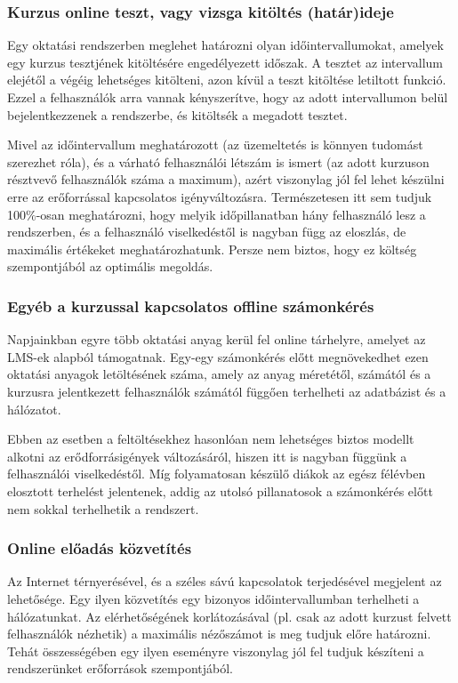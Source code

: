 \subsubsection{Kurzus online teszt, vagy vizsga kitöltés (határ)ideje}

Egy oktatási rendszerben meglehet határozni olyan időintervallumokat, amelyek egy kurzus tesztjének kitöltésére engedélyezett időszak. A tesztet az intervallum elejétől a végéig lehetséges kitölteni, azon kívül a teszt kitöltése letiltott funkció. Ezzel a felhasználók arra vannak kényszerítve, hogy az adott intervallumon belül bejelentkezzenek a rendszerbe, és kitöltsék a megadott tesztet.

Mivel az időintervallum meghatározott (az üzemeltetés is könnyen tudomást szerezhet róla), és a várható felhasználói létszám is ismert (az adott kurzuson résztvevő felhasználók száma a maximum), azért viszonylag jól fel lehet készülni erre az erőforrással kapcsolatos igényváltozásra. Természetesen itt sem tudjuk 100\%-osan meghatározni, hogy melyik időpillanatban hány felhasználó lesz a rendszerben, és a felhasználó viselkedéstől is nagyban függ az eloszlás, de maximális értékeket meghatározhatunk. Persze nem biztos, hogy ez költség szempontjából az optimális megoldás.

\subsubsection{Egyéb a kurzussal kapcsolatos offline számonkérés}

Napjainkban egyre több oktatási anyag kerül fel online tárhelyre, amelyet az LMS-ek alapból támogatnak. Egy-egy számonkérés előtt megnövekedhet ezen oktatási anyagok letöltésének száma, amely az anyag méretétől, számától és a kurzusra jelentkezett felhasználók számától függően terhelheti az adatbázist és a hálózatot.

Ebben az esetben a feltöltésekhez hasonlóan nem lehetséges biztos modellt alkotni az erődforrásigények változásáról, hiszen itt is nagyban függünk a felhasználói viselkedéstől. Míg folyamatosan készülő diákok az egész félévben elosztott terhelést jelentenek, addig az utolsó pillanatosok a számonkérés előtt nem sokkal terhelhetik a rendszert. 

\subsubsection{Online előadás közvetítés}

Az Internet térnyerésével, és a széles sávú kapcsolatok terjedésével megjelent az  lehetősége. Egy ilyen közvetítés egy bizonyos időintervallumban terhelheti a hálózatunkat. Az elérhetőségének korlátozásával (pl. csak az adott kurzust felvett felhasználók nézhetik) a maximális nézőszámot is meg tudjuk előre határozni. Tehát összességében egy ilyen eseményre viszonylag jól fel tudjuk készíteni a rendszerünket erőforrások szempontjából.  


